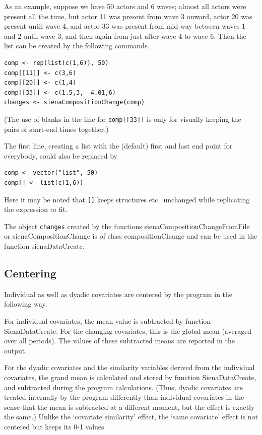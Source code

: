 \documentclass[a4paper,fleqn,11pt]{article}
\newcommand{\+}{\, + \,}
\newcommand{\sfn}[1]{\textsf{#1}}
\begin{document}
{As an example, suppose we have 50 actors and 6 waves;
almost all actors were present all the time, but actor 11 was present
from wave 3 onward, actor 20 was present until wave 4, and
actor 33 was present from mid-way between waves 1 and 2 until wave 3, and then
again from just after wave 4 to wave 6.
Then the list can be created by the following commands.
\begin{verbatim}
comp <- rep(list(c(1,6)), 50)
comp[[11]] <- c(3,6)
comp[[20]] <- c(1,4)
comp[[33]] <- c(1.5,3,  4.01,6)
changes <- sienaCompositionChange(comp)
\end{verbatim}
(The use of blanks in the line for \texttt{comp[[33]]} is only for visually
keeping the pairs of start-end times together.)

The first line, creating a list with the (default) first and
last end point for everybody, could also be replaced by
\begin{verbatim}
comp <- vector("list", 50)
comp[] <- list(c(1,6))
\end{verbatim}
Here it may be noted that \texttt{[]} keeps structures etc.\ unchanged
while replicating the expression to fit.

The object \texttt{changes} created by the functions
\sfn{sienaCompositionChangeFromFile} or
\sfn{sienaCompositionChange} is of class
\sfn{compositionChange} and can be used in the function
\sfn{sienaDataCreate}.


\subsection{Centering}
\label{S_center}

Individual as well as dyadic covariates are centered
by the program in the following way.

For individual covariates, the mean value is subtracted
by function \sfn{SienaDataCreate}. For the changing
covariates, this is the global mean (averaged over all periods).
The values of these subtracted means are reported in the output.

For the dyadic covariates and the similarity variables derived
from the individual covariates, the grand mean is calculated
and stored by function \sfn{SienaDataCreate},
and subtracted during the program calculations. (Thus,
dyadic covariates are treated internally by the program differently than
individual covariates in the sense that the mean is subtracted at
a different moment, but the effect is exactly the same.)
Unlike the `covariate similarity' effect,
the `same covariate' effect is not centered but keeps its 0-1 values.

}
\end{document}
